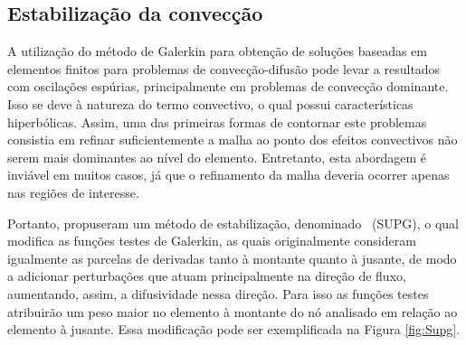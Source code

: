 %

\subsection{Estabilização da convecção}

A utilização do método de Galerkin para obtenção de soluções baseadas em elementos finitos para problemas de convecção-difusão pode levar a resultados com oscilações espúrias, principalmente em problemas de convecção dominante. Isso se deve à natureza do termo convectivo, o qual possui características hiperbólicas. Assim, uma das primeiras formas de contornar este problemas consistia em refinar suficientemente a malha ao ponto dos efeitos convectivos não serem mais dominantes ao nível do elemento. Entretanto, esta abordagem é inviável em muitos casos, já que o refinamento da malha deveria ocorrer apenas nas regiões de interesse.

Portanto,  propuseram um método de estabilização, denominado \SUPG\ (SUPG), o qual modifica as funções testes de Galerkin, as quais originalmente consideram igualmente as parcelas de derivadas tanto à montante quanto à jusante, de modo a adicionar perturbações que atuam principalmente na direção de fluxo, aumentando, assim, a difusividade nessa direção. Para isso as funções testes atribuirão um peso maior no elemento à montante do nó analisado em relação ao elemento à jusante. Essa modificação pode ser exemplificada na Figura \ref{fig:Supg}.

